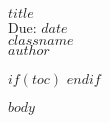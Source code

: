 \documentclass[
	twoside=false, %
	secnumdepth=2, %
	numbers=auto, %
]{kaohandt}
\title{\ptitle}
\author{\pauthor}
\date{\pdate}
\newcommand{\pdate}{$date$}
\newcommand{\pdate}{\today}
\newcommand{\passig}{$assignment$}
\newcommand{\passig}{hmm}
\newcommand{\ptitle}{$title$}
\newcommand{\ptitle}{Assignment \passig}
\newcommand{\pclass}{$classname$}
\newcommand{\pclass}{Your Class}
\newcommand{\pauthor}{$author$}
\newcommand{\pauthor}{Gabe Oppenheimer}
\newcommand{\0}{\rlap{\textsuperscript{$${\circ}$$}}\xspace\xspace}
\newcommand{\1}{\rlap{$$'$$}\xspace}
\renewcommand{\'}[1]{$$\overline{\text{#1}}$$}
\begin{document}
\begin{fullwidth}
	{\selectfont
		\noindent\textbf{\Huge{\ptitle}}\\[-.5em]

		\Large{Due: \pdate}\\[-.25em]
		\indent\Large{\textsc{\pclass}}\\[-.5em]

		\noindent\LARGE{\pauthor}
	}
\end{fullwidth}

$if(toc)$
\margintoc
$endif$

\medskip


$body$



\end{document}
